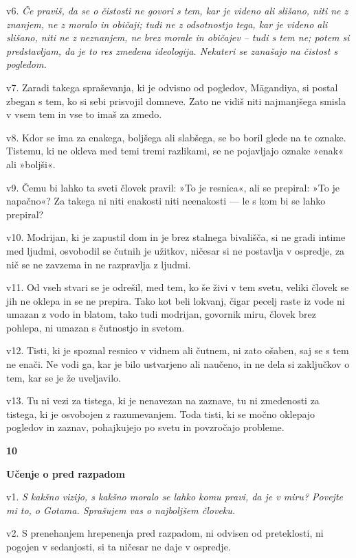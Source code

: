 v6. \emph{Če praviš, da se o čistosti ne govori s tem, kar je videno ali slišano, niti ne z znanjem, ne z moralo in običaji; tudi ne z odsotnostjo tega, kar je videno ali slišano, niti ne z neznanjem, ne brez morale in običajev -- tudi s tem ne; potem si predstavljam, da je to res zmedena ideologija. Nekateri se zanašajo na čistost s pogledom.}

v7. Zaradi takega spraševanja, ki je odvisno od pogledov, Māgandiya, si postal zbegan s tem, ko si sebi prisvojil domneve. Zato ne vidiš niti najmanjšega smisla v vsem tem in vse to imaš za zmedo.

v8. Kdor se ima za enakega, boljšega ali slabšega, se bo boril glede na te oznake. Tistemu, ki ne okleva med temi tremi razlikami, se ne pojavljajo oznake »enak« ali »boljši«.

v9. Čemu bi lahko ta sveti človek pravil: »To je resnica«, ali se prepiral: »To je napačno«? Za takega ni niti enakosti niti neenakosti --- le s kom bi se lahko prepiral?

v10. Modrijan, ki je zapustil dom in je brez stalnega bivališča, si ne gradi intime med ljudmi, osvobodil se čutnih je užitkov, ničesar si ne postavlja v ospredje, za nič se ne zavzema in ne razpravlja z ljudmi.

v11. Od vseh stvari se je odrešil, med tem, ko še živi v tem svetu, veliki človek se jih ne oklepa in se ne prepira. Tako kot beli lokvanj, čigar pecelj raste iz vode ni umazan z vodo in blatom, tako tudi modrijan, govornik miru, človek brez pohlepa, ni umazan s čutnostjo in svetom.

v12. Tisti, ki je spoznal resnico v vidnem ali čutnem, ni zato ošaben, saj se s tem ne enači. Ne vodi ga, kar je bilo ustvarjeno ali naučeno, in ne dela si zaključkov o tem, kar se je že uveljavilo.

v13. Tu ni vezi za tistega, ki je nenavezan na zaznave, tu ni zmedenosti za tistega, ki je osvobojen z razumevanjem. Toda tisti, ki se močno oklepajo pogledov in zaznav, pohajkujejo po svetu in povzročajo probleme.

\textbf{10 }

\textbf{Učenje o pred razpadom }

v1. \emph{S kakšno vizijo, s kakšno moralo se lahko komu pravi, da je v miru? Povejte mi to, o Gotama. Sprašujem vas o najboljšem človeku.}

v2. S prenehanjem hrepenenja pred razpadom, ni odvisen od preteklosti, ni pogojen v sedanjosti, si ta ničesar ne daje v ospredje.

